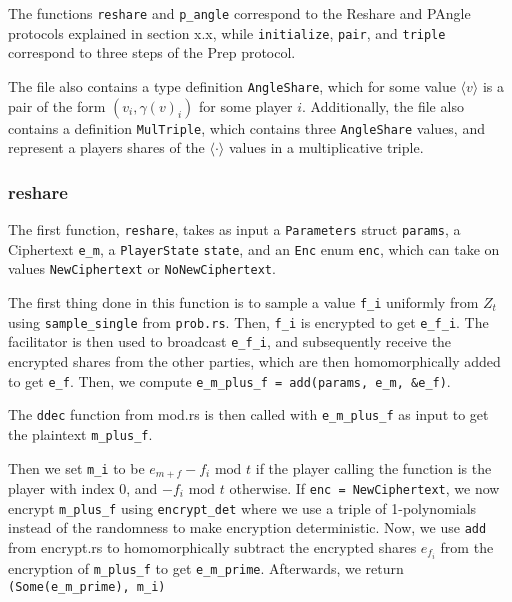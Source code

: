 \documentclass[../main.tex]{subfiles}
\begin{document}
The functions \lstinline{reshare} and \lstinline{p_angle} correspond to the Reshare and PAngle protocols explained in section x.x, while \lstinline{initialize}, \lstinline{pair}, and \lstinline{triple} correspond to three steps of the Prep protocol.

The file also contains a type definition \lstinline{AngleShare}, which for some value $\langle v \rangle$ is a pair of the form $(v_i, \gamma(v)_i)$ for some player $i$. Additionally, the file also contains a definition \lstinline{MulTriple}, which contains three \lstinline{AngleShare} values, and represent a players shares of the $\langle \cdot \rangle$ values in a multiplicative triple. %

\subsubsection{reshare}
The first function, \lstinline{reshare}, takes as input a \lstinline{Parameters} struct \lstinline{params}, a Ciphertext \lstinline{e_m}, a  \lstinline{PlayerState} \lstinline{state}, and an \lstinline{Enc} enum \lstinline{enc}, which can take on values \lstinline{NewCiphertext} or \lstinline{NoNewCiphertext}.

The first thing done in this function is to sample a value \lstinline{f_i} uniformly from $Z_t$ using \lstinline{sample_single} from \lstinline{prob.rs}. Then, \lstinline{f_i} is encrypted to get \lstinline{e_f_i}.
The facilitator is then used to broadcast \lstinline{e_f_i}, and subsequently receive the encrypted shares from the other parties, which are then homomorphically added to get \lstinline{e_f}. Then, we compute \lstinline{e_m_plus_f = add(params, e_m, &e_f)}.

The \lstinline{ddec} function from mod.rs is then called with \lstinline{e_m_plus_f} as input to get the plaintext \lstinline{m_plus_f}.

Then we set \lstinline{m_i} to be $e_{m + f} - f_i \text{ mod } t$ if the player calling the function is the player with index $0$, and $- f_i \text{ mod } t$ otherwise. If \lstinline{enc = NewCiphertext}, we now encrypt \lstinline{m_plus_f} using \lstinline{encrypt_det} where we use a triple of 1-polynomials instead of the randomness to make encryption deterministic. Now, we use \lstinline{add} from encrypt.rs to homomorphically subtract the encrypted shares $e_{f_i}$ from the encryption of \lstinline{m_plus_f} to get \lstinline{e_m_prime}. Afterwards, we return \lstinline{(Some(e_m_prime), m_i)}
\end{document}
